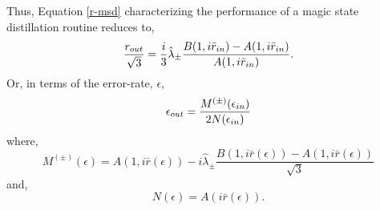 \documentclass[11pt]{article}
\begin{document}
Thus, Equation \eqref{r-msd} characterizing the performance of a magic state distillation routine reduces to,
\begin{equation}
\frac{r_{\rm out}}{\sqrt{3}} = \frac{i}{3} \hat{\lambda}_\pm \frac{B(1,i\bar{r}_{\rm in})-A(1,i\bar{r}_{\rm in})}{A(1,i\bar{r}_{\rm in})}.
\end{equation}
Or, in terms of the error-rate, $\epsilon$,
\begin{equation}
\epsilon_{\rm out} = \frac{M^{(\pm)}(\epsilon_{\rm in})}{2N(\epsilon_{\rm in})} \label{error-output}
\end{equation}
where,
\begin{equation}
    M^{(\pm)}(\epsilon) =A\left(1,i \bar{r}(\epsilon)\right)-i \hat{\lambda}_\pm \frac{B(1,i\bar{r}(\epsilon))-A(1, i \bar{r}(\epsilon))}{\sqrt{3}}
\end{equation}
and,
\begin{equation}
  N(\epsilon) = A(i\bar{r}(\epsilon)).  
\end{equation}
\end{document}
